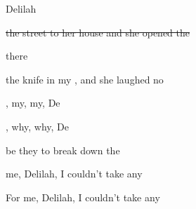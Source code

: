\begin{SBSong}{Delilah}
\begin{SBVerse}
      \sout{ the street to her house and she opened the }
    \fi
    
      there 

     the knife in my , and she laughed no  
  \end{SBVerse}
  \begin{SBVerse}
    , my, my, De

    , why, why, De

     be they  to break down the 

     me, Delilah, I  couldn't take any  

    For me, Delilah, I  couldn't take any 
  \end{SBVerse}
\end{SBSong}
